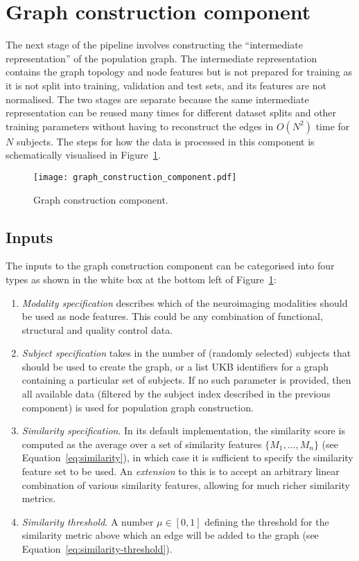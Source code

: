 \section{Graph construction component}

The next stage of the pipeline involves constructing the ``intermediate representation'' of the population graph. The intermediate representation contains the graph topology and node features but is not prepared for training as it is not split into training, validation and test sets, and its features are not normalised. The two stages are separate because the same intermediate representation can be reused many times for different dataset splits and other training parameters without having to reconstruct the edges in $O(N^2)$ time for $N$ subjects. The steps for how the data is processed in this component is schematically visualised in Figure~\ref{graph-construction-component}.

\begin{figure}[h]
    \texttt{[image: graph\_construction\_component.pdf]}
    \caption{Graph construction component.}\label{graph-construction-component}
\end{figure}

\subsection{Inputs}
The inputs to the graph construction component can be categorised into four types as shown in the white box at the bottom left of Figure~\ref{graph-construction-component}:
\begin{enumerate}
    \item \textit{Modality specification} describes which of the neuroimaging modalities should be used as node features. This could be any combination of functional, structural and quality control data.
    \item \textit{Subject specification} takes in the number of (randomly selected) subjects that should be used to create the graph, or a list UKB identifiers for a graph containing a particular set of subjects. If no such parameter is provided, then all available data (filtered by the subject index described in the previous component) is used for population graph construction.
    \item \textit{Similarity specification}. 
    In its default implementation, the similarity score is computed as the average over a set of similarity features $\{M_1, \dots, M_n\}$ (see Equation~\eqref{eq:similarity}), in which case it is sufficient to specify the similarity feature set to be used. An \textit{extension} to this is to accept an arbitrary linear combination of various similarity features, allowing for much richer similarity metrics. 
    \item \textit{Similarity threshold}. A number $\mu \in [0,1]$ defining the threshold for the similarity metric above which an edge will be added to the graph (see Equation~\eqref{eq:similarity-threshold}).
\end{enumerate}


